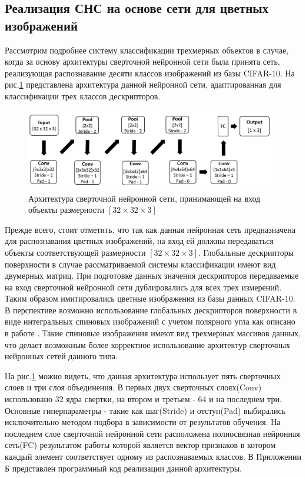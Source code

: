 \documentclass[14pt]{article}
\numberwithin{figure}{section}
\numberwithin{equation}{section}
\begin{document}
 \subsection{Реализация СНС на основе сети для цветных изображений}\label{ssec4.2}

Рассмотрим подробнее систему классификации трехмерных объектов в случае, когда за основу архитектуры сверточной нейронной сети была принята сеть, реализующая распознавание десяти классов изображений из базы CIFAR-10. На рис.\ref{ris:9} представлена архитектура данной нейронной сети, адаптированная для классификации трех классов дескрипторов.

\begin{figure}[h]
   \begin{center}
       \includegraphics[scale=0.7] {9.JPG}
       \caption{Архитектура сверточной нейронной сети, принимающей на вход объекты размерности $[32 \times 32 \times 3]$}
       \label{ris:9}
   \end{center}
\end{figure}

Прежде всего, стоит отметить, что так как данная нейронная сеть предназначена для распознавания цветных изображений, на вход ей должны передаваться объекты соответствующей размерности $[32 \times 32 \times 3]$. Глобальные дескрипторы поверхности в случае рассматриваемой системы классификации имеют вид двумерных матриц. При подготовке данных значения дескрипторов передаваемые на вход сверточной нейронной сети дублировались для всех трех измерений. Таким образом имитировались цветные изображения из базы данных CIFAR-10. В перспективе возможно использование глобальных дескрипторов поверхности в виде интегральных спиновых изображений с учетом полярного угла как описано в работе \cite{Chernikoff}. Такие спиновые изображения имеют вид трехмерных массивов данных, что делает возможным более корректное использование архитектур сверточных нейронных сетей данного типа.

На рис.\ref{ris:9} можно видеть, что данная архитектура использует пять сверточных слоев и три слоя объединения. В первых двух сверточных слоях(Conv) использовано 32 ядра свертки, на втором и третьем - 64 и на последнем три. Основные гиперпараметры - такие как шаг(Stride) и отступ(Pad) выбирались исключительно методом подбора в зависимости от результатов обучения. На последнем слое сверточной нейронной сети расположена полносвязная нейронная сеть(FC) результатом работы которой является вектор признаков в котором каждый элемент соответствует одному из распознаваемых классов. В Приложении Б представлен программный код реализации данной архитектуры.
\end{document}
